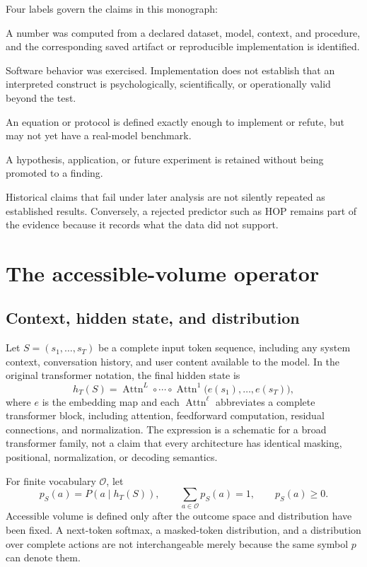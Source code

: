 Four labels govern the claims in this monograph:
\begin{description}[style=nextline]
  \item[Measured.] A number was computed from a declared dataset, model, context, and procedure, and the corresponding saved artifact or reproducible implementation is identified.
  \item[Implemented.] Software behavior was exercised. Implementation does not establish that an interpreted construct is psychologically, scientifically, or operationally valid beyond the test.
  \item[Formulated.] An equation or protocol is defined exactly enough to implement or refute, but may not yet have a real-model benchmark.
  \item[Proposed.] A hypothesis, application, or future experiment is retained without being promoted to a finding.
\end{description}
Historical claims that fail under later analysis are not silently repeated as established results. Conversely, a rejected predictor such as HOP remains part of the evidence because it records what the data did not support.

\section{The accessible-volume operator}
\subsection{Context, hidden state, and distribution}
Let $S=(s_1,\ldots,s_T)$ be a complete input token sequence, including any system context, conversation history, and user content available to the model. In the original transformer notation, the final hidden state is
\begin{equation}
h_T(S)=\operatorname{Attn}^{L}\circ\cdots\circ\operatorname{Attn}^{1}
       \bigl(e(s_1),\ldots,e(s_T)\bigr),
\label{eq:hidden-state}
\end{equation}
where $e$ is the embedding map and each $\operatorname{Attn}^{\ell}$ abbreviates a complete transformer block, including attention, feedforward computation, residual connections, and normalization. The expression is a schematic for a broad transformer family, not a claim that every architecture has identical masking, positional, normalization, or decoding semantics.

For finite vocabulary $\mathcal O$, let
\begin{equation}
p_S(a)=P\!\left(a\mid h_T(S)\right),\qquad \sum_{a\in\mathcal O}p_S(a)=1,
\qquad p_S(a)\geq0.
\end{equation}
Accessible volume is defined only after the outcome space and distribution have been fixed. A next-token softmax, a masked-token distribution, and a distribution over complete actions are not interchangeable merely because the same symbol $p$ can denote them.

